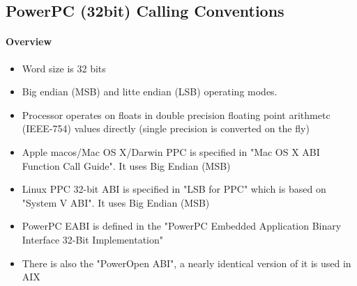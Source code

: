 %
%
%
%

\subsection{PowerPC (32bit) Calling Conventions}

\paragraph{Overview}

\begin{itemize}
\item Word size is 32 bits
\item Big endian (MSB) and litte endian (LSB) operating modes.
\item Processor operates on floats in double precision floating point arithmetc (IEEE-754) values directly (single precision is converted on the fly)
\item Apple macos/Mac OS X/Darwin PPC is specified in "Mac OS X ABI Function Call Guide"\cite{ppcMacOSX}. It uses Big Endian (MSB)
\item Linux PPC 32-bit ABI is specified in "LSB for PPC"\cite{ppc32LSB} which is based on "System V ABI". It uses Big Endian (MSB)
\item PowerPC EABI is defined in the "PowerPC Embedded Application Binary Interface 32-Bit Implementation"\cite{ppceabi}
\item There is also the "PowerOpen ABI"\cite{poabi}, a nearly identical version of it is used in AIX %
\end{itemize}

